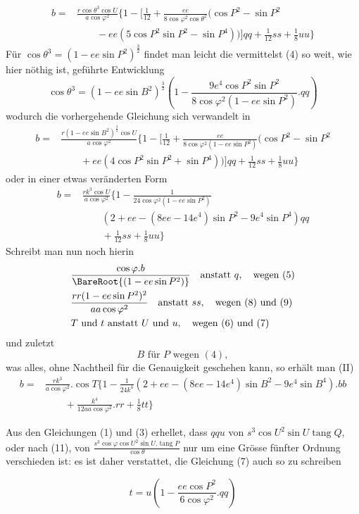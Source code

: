 %
\[
\begin{aligned}
b={}&\frac{r\cos\theta^3\cos U}{a\cos\varphi^2}\{1-[\tfrac1{12}+\frac{ee}{8\cos\varphi^2\cos\theta^2}(\cos P^2-\sin P^2\\
&\qquad-ee(5\cos P^2\sin P^2-\sin P^4))]qq+\tfrac1{12}ss+\tfrac18uu\}
\end{aligned}
\]
Für \(\cos\theta^3=(1-ee\sin P^2)^{\frac32}\) findet man leicht die vermittelst (4) so weit, wie hier nöthig ist, geführte Entwicklung
\[
\cos\theta^3=(1-ee\sin B^2)^{\frac32}(1-\frac{9e^4\cos P^2\sin P^2}{8\cos\varphi^2(1-ee\sin P^2)}\mathord{.}qq)
\]
wodurch die vorhergehende Gleichung sich verwandelt in
\[
\begin{aligned}
b={}&\frac{r(1-ee\sin B^2)^{\frac32}\cos U}{a\cos\varphi^2}\{1-[\tfrac1{12}+\frac{ee}{8\cos\varphi^2(1-ee\sin P^2)}(\cos P^2-\sin P^2\\
&\qquad+ee(4\cos P^2\sin P^2+\sin P^4))]qq+\tfrac1{12}ss+\tfrac18uu\}
\end{aligned}
\]
oder in einer etwas veränderten Form
\[
\begin{aligned}
b={}&\frac{rk^3\cos U}{a\cos\varphi^2}\{1-\frac{1}{24\cos\varphi^2(1-ee\sin P^2)}\\
&\qquad(2+ee-(8ee-14e^4)\sin P^2-9e^4\sin P^4)qq\\
&\qquad+\tfrac1{12}ss+\tfrac18uu\}
\end{aligned}
\]
Schreibt man nun noch hierin
\[
\begin{aligned}
&\frac{\cos\varphi\mathord{.}b}{\BareRoot{(1-ee\sin P^2)}}\quad\text{anstatt }q,\quad\text{wegen }(5)\\
&\frac{rr(1-ee\sin P^2)^2}{aa\cos\varphi^2}\quad\text{anstatt }ss,\quad\text{wegen }(8)\text{ und }(9)\\
&T\text{ und }t\text{ anstatt }U\text{ und }u,\quad\text{wegen }(6)\text{ und }(7)
\end{aligned}
\]
und zuletzt
\[
B\text{ für }P\text{ wegen }(4),
\]
was alles, ohne Nachtheil für die Genauigkeit geschehen kann, so erhält man (II)
\[
\begin{aligned}
b={}&\frac{rk^3}{a\cos\varphi^2}\mathord{.}\cos T\{1-\frac1{24k^4}(2+ee-(8ee-14e^4)\sin B^2-9e^4\sin B^4)\mathord{.}bb\\
&\qquad+\frac{k^4}{12aa\cos\varphi^2}\mathord{.}rr+\tfrac18tt\}
\end{aligned}
\]

\begingroup\raggedright
\hspace*{1.2em}Aus den Gleichungen (1) und (3) erhellet, dass \(qqu\) von \(s^3\cos U^2\sin U\operatorname{tang}Q\), oder nach (11), von \(\frac{s^3\cos\varphi\cos U^2\sin U\mathord{.}\operatorname{tang}P}{\cos\theta}\) nur um eine Grösse fünfter Ordnung verschieden ist: es ist daher verstattet, die Gleichung (7) auch so zu schreiben\par\endgroup
\[
t=u(1-\frac{ee\cos P^2}{6\cos\varphi^2}\mathord{.}qq)
\]
